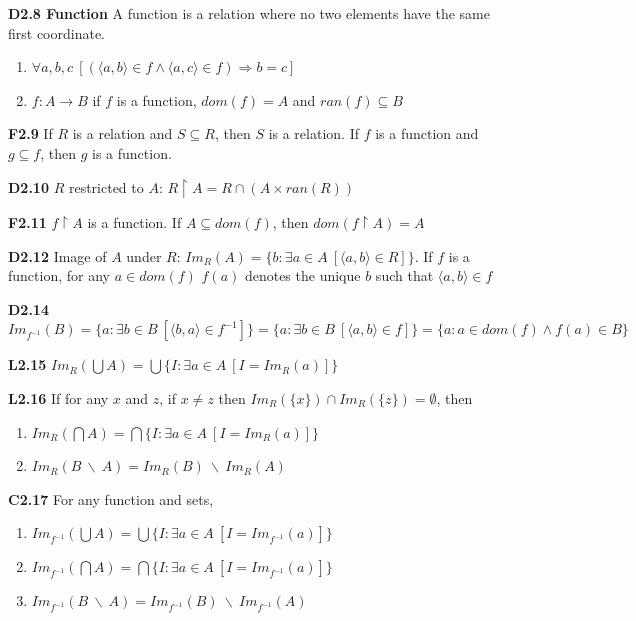 \documentclass[10pt, landscape]{article}
\begin{document}
\begin{multicols*}{3}
\textbf{D2.8 Function} A function is a relation where no  two elements have the same first coordinate.
\begin{enumerate}
    \item 
    $\forall a,b,c \ [(\langle a, b \rangle \in f \land \langle a, c \rangle \in f) \Rightarrow b=c]$
    \item $f:A \rightarrow B$ if $f$ is a function, $dom(f)=A$ and $ran(f) \subseteq B$
\end{enumerate}

\textbf{F2.9} If $R$ is a relation and $S \subseteq R$, then $S$ is a relation. If $f$ is a function and $g \subseteq f$, then $g$ is a function.

\textbf{D2.10} $R$ restricted to $A$: $R \restriction A=R \cap (A \times ran(R))$

\textbf{F2.11} $f \restriction A$ is a function. If $A \subseteq dom(f)$, then $dom(f \restriction A) = A$

\textbf{D2.12} Image of $A$ under $R$: $Im_R(A)=\{b:\exists a \in A \ [\langle a, b \rangle \in R]\}$. If $f$ is a function, for any $a \in dom(f)$ $f(a)$ denotes the unique $b$ such that $\langle a, b \rangle \in f$

\textbf{D2.14} $Im_{f^{-1}}(B)=\{a:\exists b \in B \ [\langle b, a \rangle \in f^{-1}]\}=\{a:\exists b \in B \ [\langle a, b \rangle \in f]\}=\{a:a \in dom(f) \land f(a) \in B\}$

\textbf{L2.15} $Im_R(\bigcup A)=\bigcup\{I:\exists a \in A \ [I=Im_R(a)]\}$

\textbf{L2.16} If for any $x$ and $z$, if $x \neq z$ then $Im_R(\{x\})\cap Im_R(\{z\})=\emptyset$, then
\begin{enumerate}
    \item $Im_R(\bigcap A)=\bigcap\{I:\exists a \in A \ [I=Im_R(a)]\}$
    \item $Im_R(B \ \backslash \ A)=Im_R(B)\ \backslash \ Im_R(A)$
\end{enumerate}

\textbf{C2.17} For any function and sets,
\begin{enumerate}
    \item $Im_{f^{-1}}(\bigcup A)=\bigcup\{I:\exists a \in A \ [I=Im_{f^{-1}}(a)]\}$
    \item $Im_{f^{-1}}(\bigcap A)=\bigcap\{I:\exists a \in A \ [I=Im_{f^{-1}}(a)]\}$
    \item $Im_{f^{-1}}(B \ \backslash \ A)=Im_{f^{-1}}(B) \ \backslash \ Im_{f^{-1}}(A)$
\end{enumerate}


\end{multicols*}
\end{document}
